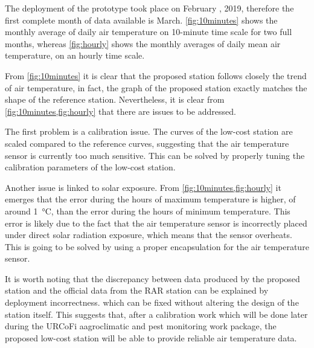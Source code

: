 \documentclass[conference]{IEEEtran}
\begin{document}
The deployment of the prototype took place on February , 2019,  therefore the first complete month of data available is March. 
\cref{fig:10minutes} shows the monthly average of daily air temperature on 10-minute time scale for two full months, whereas \cref{fig:hourly} shows the monthly averages of daily mean air temperature, on an hourly time scale.

From \cref{fig:10minutes} it is clear that the proposed station follows closely the trend of air temperature, in fact, the graph of the proposed station exactly matches the shape of the reference station. Nevertheless, it is clear from \cref{fig:10minutes,fig:hourly} that there are issues to be addressed. 

The first problem is a calibration issue. The curves of the low-cost station are scaled compared to the reference curves, suggesting that the air temperature sensor is currently too much sensitive. This can be solved by properly tuning the calibration parameters of the low-cost station.

Another issue is linked to solar exposure.
From \cref{fig:10minutes,fig:hourly} it emerges that the error during the hours of maximum temperature is higher, of around \SI{1}{\celsius}, than the error during the hours of minimum temperature. 
This error is likely due to the fact that the air temperature sensor is incorrectly placed under direct solar radiation exposure, which means that the sensor overheats. 
This is going to be solved by using a proper encapsulation for the air temperature sensor.

It is worth noting that the discrepancy between data produced by the proposed station and the official data from the RAR station can be explained by deployment incorrectness. which can be fixed without altering the design of the station itself. This suggests that, after a calibration work which will be done later during the URCoFi aagroclimatic and pest monitoring work package, the proposed low-cost station will be able to provide reliable air temperature data.
\end{document}
